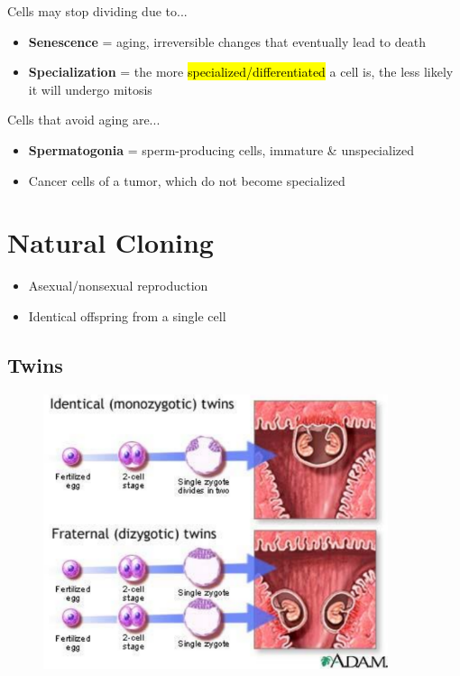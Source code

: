 \documentclass[a4paper,12pt]{article}
\begin{document}
Cells may stop dividing due to...
\begin{itemize}
    \item{\textbf{Senescence} = aging, irreversible changes that eventually lead to death}
    \item{\textbf{Specialization} = the more \hl{specialized/differentiated} a cell is, the less likely it will undergo mitosis}
\end{itemize}

Cells that avoid aging are...
\begin{itemize}
    \item{\textbf{Spermatogonia} = sperm-producing cells, immature \& unspecialized}
    \item{Cancer cells of a tumor, which do not become specialized}
\end{itemize}

\section{Natural Cloning}
\begin{itemize}
    \item{Asexual/nonsexual reproduction}
    \item{Identical offspring from a single cell}
\end{itemize}

\subsection{Twins}
\begin{figure}[H]
    \centering
    \includegraphics[width=0.9\textwidth]{twins}
\end{figure}
\end{document}
